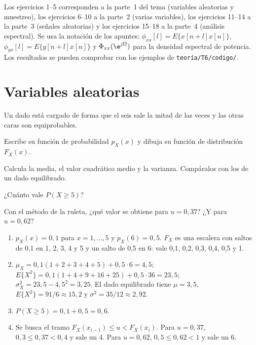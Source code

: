 \documentclass[11pt,a4paper]{scrartcl}
\begin{document}
\ifsoluciones{}\else{}\fi

Los ejercicios 1–5 corresponden a la parte~1 del tema (variables aleatorias y muestreo), los ejercicios 6–10 a la parte~2 (varias variables), los ejercicios 11–14 a la parte~3 (señales aleatorias) y los ejercicios 15–18 a la parte~4 (análisis espectral). Se usa la notación de los apuntes: $\phi_{xx}[l]=E\{x[n+l]x[n]\}$, $\phi_{yx}[l]=E\{y[n+l]x[n]\}$ y $\Phi_{xx}(\e^{j\Omega})$ para la densidad espectral de potencia. Los resultados se pueden comprobar con los ejemplos de \texttt{teoría/T6/codigo/}.

\section*{Variables aleatorias}

\begin{ejercicio}
  Un dado está cargado de forma que el seis sale la mitad de las veces y las otras caras son equiprobables.
  \begin{incisos}[1]
    \item Escribe su función de probabilidad $p_X(x)$ y dibuja su función de distribución $F_X(x)$.
    \item Calcula la media, el valor cuadrático medio y la varianza. Compáralos con los de un dado equilibrado.
    \item ¿Cuánto vale $P(X\ge5)$?
    \item Con el método de la ruleta, ¿qué valor se obtiene para $u=0{,}37$? ¿Y para $u=0{,}62$?
  \end{incisos}
\end{ejercicio}
\begin{solucion}
  \begin{enumerate}[label=\alph*)]
    \item $p_X(x)=0{,}1$ para $x=1,\dots,5$ y $p_X(6)=0{,}5$. $F_X$ es una escalera con saltos de 0,1 en 1, 2, 3, 4 y 5 y un salto de 0,5 en 6: vale 0,1, 0,2, 0,3, 0,4, 0,5 y 1.
    \item $\mu_X=0{,}1(1+2+3+4+5)+0{,}5\cdot6=4{,}5$; $E\{X^2\}=0{,}1(1+4+9+16+25)+0{,}5\cdot36=23{,}5$; $\sigma_X^2=23{,}5-4{,}5^2=3{,}25$. El dado equilibrado tiene $\mu=3{,}5$, $E\{X^2\}=91/6\approx15{,}2$ y $\sigma^2=35/12\approx2{,}92$.
    \item $P(X\ge5)=0{,}1+0{,}5=0{,}6$.
    \item Se busca el tramo $F_X(x_{i-1})\le u<F_X(x_i)$. Para $u=0{,}37$, $0{,}3\le0{,}37<0{,}4$ y sale un 4. Para $u=0{,}62$, $0{,}5\le0{,}62<1$ y sale un 6.
  \end{enumerate}
\end{solucion}
\end{document}
